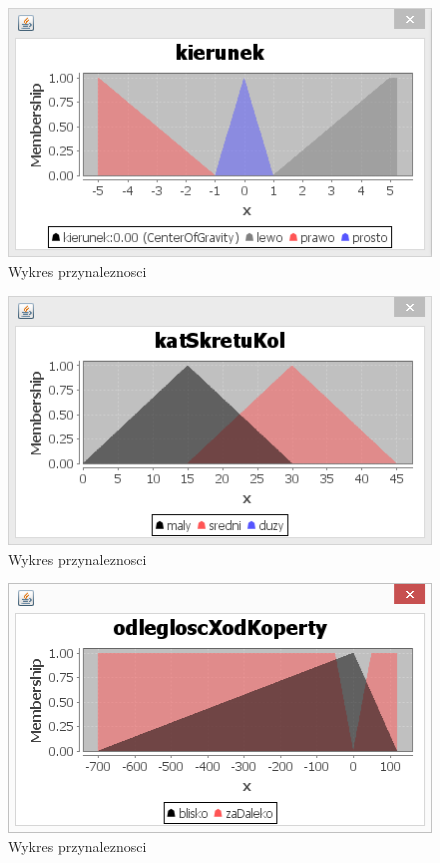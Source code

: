 \documentclass{classrep}
\begin{document}
\begin{figure}[ht]
\centering
			\includegraphics[scale=0.8]{pictures/Obraz06.png}
	\caption{Wykres przynaleznosci}
	\label{fig:Wykres przynaleznosci}
\end{figure}

\begin{figure}[ht]
\centering
			\includegraphics[scale=0.8]{pictures/Obraz07.png}
	\caption{Wykres przynaleznosci}
	\label{fig:Wykres przynaleznosci}
\end{figure}

\begin{figure}[ht]
\centering
			\includegraphics[scale=0.8]{pictures/Obraz08.png}
	\caption{Wykres przynaleznosci}
	\label{fig:Wykres przynaleznosci}
\end{figure}
\end{document}
